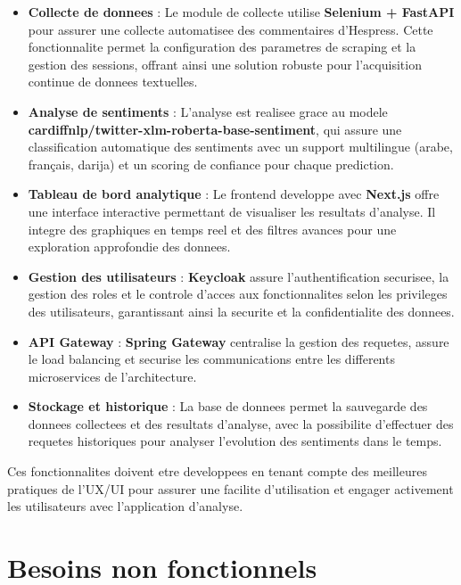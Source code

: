 \begin{itemize}
    \item \textbf{Collecte de donnees} : Le module de collecte utilise \textbf{Selenium + FastAPI} pour assurer une collecte automatisee des commentaires d'Hespress. Cette fonctionnalite permet la configuration des parametres de scraping et la gestion des sessions, offrant ainsi une solution robuste pour l'acquisition continue de donnees textuelles.
    
    \item \textbf{Analyse de sentiments} : L'analyse est realisee grace au modele \textbf{cardiffnlp/twitter-xlm-roberta-base-sentiment}, qui assure une classification automatique des sentiments avec un support multilingue (arabe, français, darija) et un scoring de confiance pour chaque prediction.
    
    \item \textbf{Tableau de bord analytique} : Le frontend developpe avec \textbf{Next.js} offre une interface interactive permettant de visualiser les resultats d'analyse. Il integre des graphiques en temps reel et des filtres avances pour une exploration approfondie des donnees.
    
    \item \textbf{Gestion des utilisateurs} : \textbf{Keycloak} assure l'authentification securisee, la gestion des roles et le controle d'acces aux fonctionnalites selon les privileges des utilisateurs, garantissant ainsi la securite et la confidentialite des donnees.
    
    \item \textbf{API Gateway} : \textbf{Spring Gateway} centralise la gestion des requetes, assure le load balancing et securise les communications entre les differents microservices de l'architecture.
    
    \item \textbf{Stockage et historique} : La base de donnees permet la sauvegarde des donnees collectees et des resultats d'analyse, avec la possibilite d'effectuer des requetes historiques pour analyser l'evolution des sentiments dans le temps.
\end{itemize}

Ces fonctionnalites doivent etre developpees en tenant compte des meilleures pratiques de l'UX/UI pour assurer une facilite d'utilisation et engager activement les utilisateurs avec l'application d'analyse.

\section{Besoins non fonctionnels}

